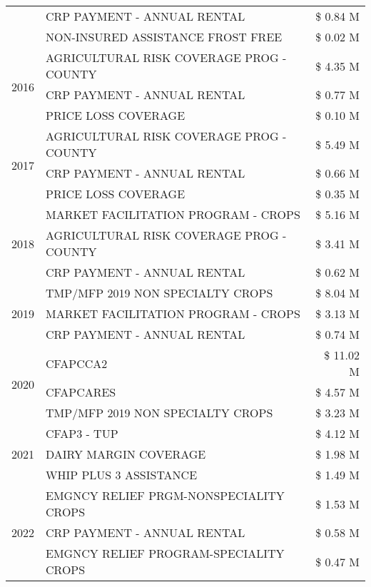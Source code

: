 \begin{tabular}{llr}
 & CRP PAYMENT - ANNUAL RENTAL & \$ 0.84 M \\
 & NON-INSURED ASSISTANCE FROST FREE & \$ 0.02 M \\
\cline{1-3}
\multirow[t]{3}{*}{2016} & AGRICULTURAL RISK COVERAGE PROG - COUNTY & \$ 4.35 M \\
 & CRP PAYMENT - ANNUAL RENTAL & \$ 0.77 M \\
 & PRICE LOSS COVERAGE & \$ 0.10 M \\
\cline{1-3}
\multirow[t]{3}{*}{2017} & AGRICULTURAL RISK COVERAGE PROG - COUNTY & \$ 5.49 M \\
 & CRP PAYMENT - ANNUAL RENTAL & \$ 0.66 M \\
 & PRICE LOSS COVERAGE & \$ 0.35 M \\
\cline{1-3}
\multirow[t]{3}{*}{2018} & MARKET FACILITATION PROGRAM - CROPS & \$ 5.16 M \\
 & AGRICULTURAL RISK COVERAGE PROG - COUNTY & \$ 3.41 M \\
 & CRP PAYMENT - ANNUAL RENTAL & \$ 0.62 M \\
\cline{1-3}
\multirow[t]{3}{*}{2019} & TMP/MFP 2019 NON SPECIALTY CROPS & \$ 8.04 M \\
 & MARKET FACILITATION PROGRAM - CROPS & \$ 3.13 M \\
 & CRP PAYMENT - ANNUAL RENTAL & \$ 0.74 M \\
\cline{1-3}
\multirow[t]{3}{*}{2020} & CFAPCCA2 & \$ 11.02 M \\
 & CFAPCARES & \$ 4.57 M \\
 & TMP/MFP 2019 NON SPECIALTY CROPS & \$ 3.23 M \\
\cline{1-3}
\multirow[t]{3}{*}{2021} & CFAP3 - TUP & \$ 4.12 M \\
 & DAIRY MARGIN COVERAGE & \$ 1.98 M \\
 & WHIP PLUS 3 ASSISTANCE & \$ 1.49 M \\
\cline{1-3}
\multirow[t]{3}{*}{2022} & EMGNCY RELIEF PRGM-NONSPECIALITY CROPS & \$ 1.53 M \\
 & CRP PAYMENT - ANNUAL RENTAL & \$ 0.58 M \\
 & EMGNCY RELIEF PROGRAM-SPECIALITY CROPS & \$ 0.47 M \\
\cline{1-3}
\bottomrule
\end{tabular}
